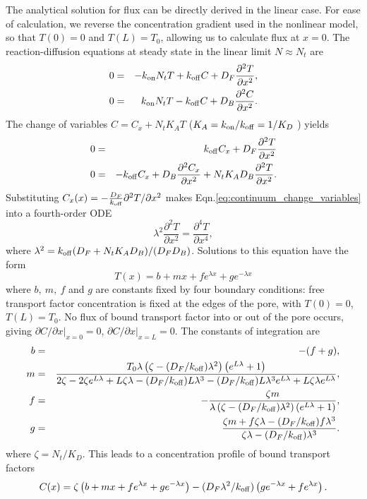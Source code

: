 The analytical solution for flux can be directly derived in the linear
case.  For ease of calculation, we reverse the concentration gradient
used in the nonlinear model, so that $T(0) = 0$ and $T(L) = T_0$, allowing
us to calculate flux at $x=0$.  The reaction-diffusion equations at steady state
in the linear limit $N \approx N_t$ are
\begin{eqnarray}
0 &=& -k_{\rm on} N_t T +k_{\rm off} C +D_F\frac{\partial^2 T}{\partial x^2},  \\ 
0 &=& k_{\rm on} N_tT -k_{\rm off} C + D_B \frac{\partial^2 C}{\partial x^2} .
\label{eq:continuum_linear} 
\end{eqnarray}
The change of variables $C = C_x + N_t K_A T$ ($K_A =  k_{\rm on} / k_{\rm off}  = 1/K_D $ ) yields
\begin{eqnarray}
  0 &=& k_{\rm off} C_x +D_F\frac{\partial^2 T}{\partial x^2}   \\ 
  0 &=& -k_{\rm off} C_x  + D_B \frac{\partial^2 C_x}{\partial x^2} + N_t
        K_A  D_B \frac{\partial^2 T}{\partial x^2}.
\label{eq:continuum_change_variables} 
\end{eqnarray}
Substituting $C_x(x) = -\frac{D_F}{k_{\rm off}}\partial^2T/\partial x^2$
makes Eqn.\ref{eq:continuum_change_variables} into a fourth-order
ODE
\begin{equation}
  \lambda^2 \frac{\partial^2 T}{\partial x^2} =  \frac{\partial^4
    T}{\partial x^4}, 
\label{continuum} 
\end{equation} 
where $\lambda^2 = k_{\rm off}(D_F+ N_t K_A D_B)/(D_FD_B)$.  Solutions to
this equation have the form
$$T(x) = b + m x + f e^{\lambda x} + g e^{-\lambda x}$$ where
$b,\ m,\ f$ and $g$ are constants fixed by four boundary conditions:
free transport factor concentration is fixed at the edges of the pore, with
$T(0) = 0 $, $T(L)=T_0$. No flux of bound transport factor into or out of the pore
occurs, giving $\partial C/\partial x |_{x=0} =0$,
$\partial C/\partial x|_{x=L} = 0$.  The constants of integration are
\begin{eqnarray}
b&=& - (f+g),\\
m & =& \frac{T_0\lambda \left( \zeta -(D_F/k_{\rm off}) {\lambda}^2\right) \left(e^{L \lambda} + 1\right)}{2  \zeta - 2  \zeta e^{L \lambda} + L  \zeta \lambda -(D_F/k_{\rm off}) L {\lambda}^3 -(D_F/k_{\rm off}) L {\lambda}^3 e^{L \lambda} + L  \zeta \lambda e^{L \lambda}},\\
f &=& -\frac{ \zeta m}{\lambda \left( \zeta -(D_F/k_{\rm off}) {\lambda}^2\right) \left(e^{L \lambda} + 1\right)},\\
g &=& \frac{ \zeta m + f  \zeta \lambda- (D_F/k_{\rm off}) f {\lambda}^3 }{ \zeta \lambda -(D_F/k_{\rm off}) {\lambda}^3}.
\end{eqnarray}
where $\zeta = N_t/K_D$. This leads to a concentration profile of bound transport factors 
\begin{equation}
C(x) = \zeta \left(b + m x + f e^{\lambda x} + g e^{- \lambda
    x}\right) - (D_F{\lambda}^2/k_{\rm off})   \left(ge^{- \lambda x} + f
  e^{ \lambda x}\right). 
\end{equation}

